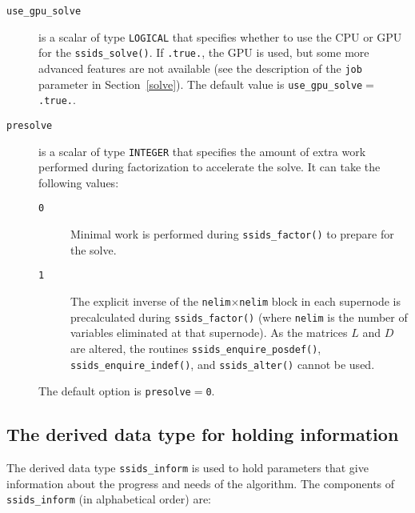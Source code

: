 \documentclass{spral}
\begin{document}

\begin{description}
\item[\texttt{use\_gpu\_solve}] is a scalar of type {\tt LOGICAL} that specifies
   whether to use the CPU or GPU for the \texttt{ssids\_solve()}. If
   \texttt{.true.}, the GPU is used, but some more advanced features are not
   available (see the description of the \texttt{job} parameter in
   Section~\ref{solve}).
   The default value is \texttt{use\_gpu\_solve}$=$\texttt{.true.}.
\item[\texttt{presolve}] is a scalar of type {\tt INTEGER} that specifies the
   amount of extra work performed during factorization to accelerate the solve.
   It can take the following values:
   \begin{description}
      \item[\texttt{0}] Minimal work is performed during {\tt ssids\_factor()}
         to prepare for the solve.
      \item[\texttt{1}] The explicit inverse of the
         \texttt{nelim}$\times$\texttt{nelim} block in each supernode is
         precalculated during {\tt ssids\_factor()} (where \texttt{nelim} is
         the number of variables eliminated at that supernode). As the matrices
         $L$ and $D$ are altered, the routines {\tt ssids\_enquire\_posdef()},
         {\tt ssids\_enquire\_indef()}, and {\tt ssids\_alter()} cannot be used.
   \end{description}
   The default option is \texttt{presolve}$=$\texttt{0}.
\end{description}


\subsection{The derived data type for holding information}
\label{typeinform}
The derived data type {\tt ssids\_inform}
is used to hold parameters that give information about the progress and needs
of the algorithm. The components of {\tt ssids\_inform}
(in alphabetical order) are:
\end{document}
